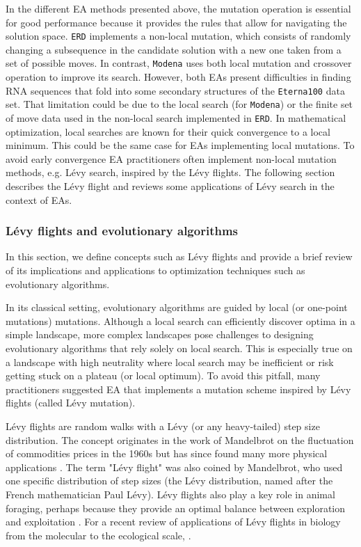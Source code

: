 In the different \ac{EA} methods presented above, the mutation operation is essential for good performance because it provides the rules that allow for navigating the solution space. \texttt{ERD} implements a non-local mutation, which consists of randomly changing a subsequence in the candidate solution with a new one taken from a set of possible moves. In contrast, \texttt{Modena} uses both local mutation and crossover operation to improve its search. However, both \acp{EA} present difficulties in finding RNA sequences that fold into some secondary structures of the \texttt{Eterna100} data set. That limitation could be due to the local search (for \texttt{Modena}) or the finite set of move data used in the non-local search implemented in \texttt{ERD}. In mathematical optimization, local searches are known for their quick convergence to a local minimum. This could be the same case for \acp{EA} implementing local mutations. To avoid early convergence \ac{EA} practitioners often implement non-local mutation methods, e.g. Lévy search, inspired by the Lévy flights. The following section describes the Lévy flight and reviews some applications of Lévy search in the context of \acp{EA}.

\subsubsection{Lévy flights and evolutionary algorithms}
In this section, we define concepts such as Lévy flights and provide a brief review of its implications and applications to optimization techniques such as evolutionary algorithms.

In its classical setting, evolutionary algorithms are guided by local (or one-point mutations) mutations. Although a local search can efficiently discover optima in a simple landscape, more complex landscapes pose challenges to designing evolutionary algorithms that rely solely on local search. This is especially true on a landscape with high neutrality where local search may be inefficient or risk getting stuck on a plateau (or local optimum). To avoid this pitfall, many practitioners suggested EA that implements a mutation scheme inspired by Lévy flights (called Lévy mutation).

Lévy flights are random walks with a Lévy (or any heavy-tailed) step size distribution. The concept originates in the work of Mandelbrot on the fluctuation of commodities prices in the 1960s \cite{mandelbrot1972certain} but has since found many more physical applications \cite{shlesinger1995levy}. The term "Lévy flight" was also coined by Mandelbrot, who used one specific distribution of step sizes (the Lévy distribution, named after the French mathematician Paul Lévy). Lévy flights also play a key role in animal foraging, perhaps because they provide an optimal balance between exploration and exploitation \cite{viswanathan2008levy,kamaruzaman2013levy}. For a recent review of applications of Lévy flights in biology from the molecular to the ecological scale, \cite{reynolds2018current}.

